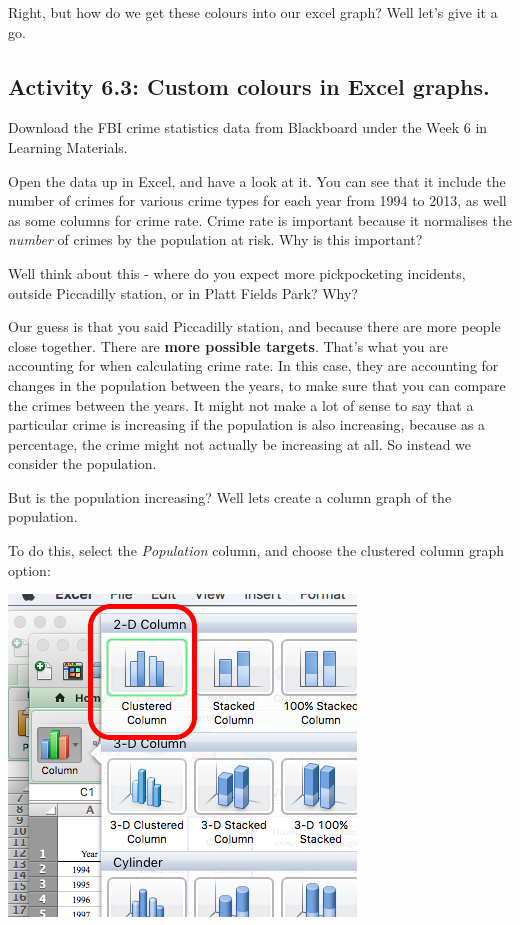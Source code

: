 \documentclass[
]{book}
\begin{document}
Right, but how do we get these colours into our excel graph? Well let's give it a go.

\hypertarget{activity-6.3-custom-colours-in-excel-graphs.}{%
\subsection{Activity 6.3: Custom colours in Excel graphs.}\label{activity-6.3-custom-colours-in-excel-graphs.}}

Download the FBI crime statistics data from Blackboard under the Week 6 in Learning Materials.

Open the data up in Excel, and have a look at it. You can see that it include the number of crimes for various crime types for each year from 1994 to 2013, as well as some columns for crime rate. Crime rate is important because it normalises the \emph{number} of crimes by the population at risk. Why is this important?

Well think about this - where do you expect more pickpocketing incidents, outside Piccadilly station, or in Platt Fields Park? Why?

Our guess is that you said Piccadilly station, and because there are more people close together. There are \textbf{more possible targets}. That's what you are accounting for when calculating crime rate. In this case, they are accounting for changes in the population between the years, to make sure that you can compare the crimes between the years. It might not make a lot of sense to say that a particular crime is increasing if the population is also increasing, because as a percentage, the crime might not actually be increasing at all. So instead we consider the population.

But is the population increasing? Well lets create a column graph of the population.

To do this, select the \emph{Population} column, and choose the clustered column graph option:

\includegraphics{imgs/desc_viz_1.png}
\end{document}
